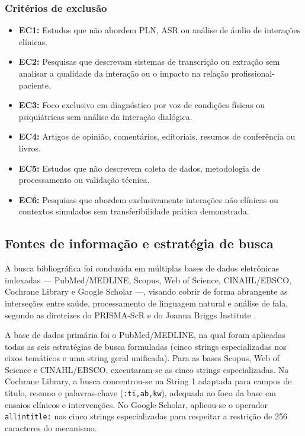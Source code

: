 \documentclass[a4paper,fleqn]{cas-sc}
\begin{document}
\subsubsection{Critérios de exclusão}
\begin{itemize}
  \item \textbf{EC1:} Estudos que não abordem PLN, ASR ou análise de áudio de
        interações clínicas.
  \item \textbf{EC2:} Pesquisas que descrevam sistemas de transcrição ou extração
        sem analisar a qualidade da interação ou o impacto na relação
        profissional-paciente.
  \item \textbf{EC3:} Foco exclusivo em diagnóstico por voz de condições físicas
        ou psiquiátricas sem análise da interação dialógica.
  \item \textbf{EC4:} Artigos de opinião, comentários, editoriais, resumos de
        conferência ou livros.
  \item \textbf{EC5:} Estudos que não descrevem coleta de dados, metodologia de
        processamento ou validação técnica.
  \item \textbf{EC6:} Pesquisas que abordem exclusivamente interações não clínicas
        ou contextos simulados sem transferibilidade prática demonstrada.
\end{itemize}

\subsection{Fontes de informação e estratégia de busca}

A busca bibliográfica foi conduzida em múltiplas bases de dados eletrônicas indexadas — PubMed/MEDLINE, Scopus, Web of Science, CINAHL/EBSCO, Cochrane Library e Google Scholar —, visando cobrir de forma abrangente as interseções entre saúde, processamento de linguagem natural e análise de fala, segundo as diretrizes do PRISMA-ScR \citep{Tricco2018} e do Joanna Briggs Institute \citep{Peters2020}. 

A base de dados primária foi o PubMed/MEDLINE, na qual foram aplicadas todas as seis estratégias de busca formuladas (cinco strings especializadas nos eixos temáticos e uma string geral unificada). Para as bases Scopus, Web of Science e CINAHL/EBSCO, executaram-se as cinco strings especializadas. Na Cochrane Library, a busca concentrou-se na String 1 adaptada para campos de título, resumo e palavras-chave (\texttt{:ti,ab,kw}), adequada ao foco da base em ensaios clínicos e intervenções. No Google Scholar, aplicou-se o operador \texttt{allintitle:} nas cinco strings especializadas para respeitar a restrição de 256 caracteres do mecanismo.
\end{document}
